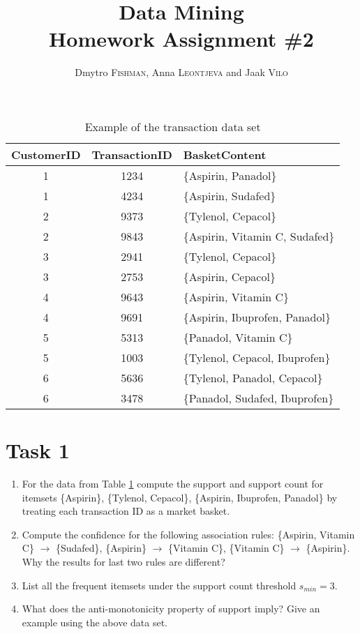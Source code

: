 \documentclass{article}
\title{Data Mining\\Homework Assignment \#2} %
\author{Dmytro \textsc{Fishman}, Anna \textsc{Leontjeva} and Jaak \textsc{Vilo}} %
\begin{document}
\maketitle %
\begin{table}[h]
\caption{Example of the transaction data set}
\label{tab:toyexample}
\begin{center}
    \begin{tabular}{| c | c | l|}
    \hline
    CustomerID & TransactionID& BasketContent \\ \hline
    	1 & 1234 & \{Aspirin, Panadol\}\\ \hline
    	1 & 4234 & \{Aspirin, Sudafed\}\\ \hline
    	2 & 9373& \{Tylenol, Cepacol\}\\ \hline
	2 & 9843& \{Aspirin, Vitamin C, Sudafed\}\\ \hline 
	3 & 2941& \{Tylenol, Cepacol\}\\ \hline  
	3 & 2753& \{Aspirin, Cepacol\}\\ \hline
	4 & 9643& \{Aspirin, Vitamin C\}\\ \hline
	4 & 9691& \{Aspirin, Ibuprofen, Panadol\}\\ \hline
	5 & 5313& \{Panadol, Vitamin C\}\\ \hline
	5 & 1003& \{Tylenol, Cepacol, Ibuprofen\}\\ \hline
	6 & 5636& \{Tylenol, Panadol, Cepacol\}\\ \hline
	6 & 3478& \{Panadol, Sudafed, Ibuprofen\}\\ \hline
 \end{tabular}
\end{center}
\end{table}
\section*{Task 1}
\begin{enumerate}
\item For the data from Table \ref{tab:toyexample} compute the support and support count for itemsets \{Aspirin\}, \{Tylenol, Cepacol\}, \{Aspirin, Ibuprofen, Panadol\} by treating each transaction ID as a market basket.
\item Compute the confidence for the following association rules: \{Aspirin, Vitamin C\} $\rightarrow$ \{Sudafed\}, \{Aspirin\} $\rightarrow$ \{Vitamin C\}, \{Vitamin C\} $\rightarrow$ \{Aspirin\}. Why the results for last two rules are different?
\item List all the frequent itemsets under the support count threshold $s_{min} = 3$.
\item What does the anti-monotonicity property of support imply? Give an example using the above data set. 
\end{enumerate}
\end{document}

